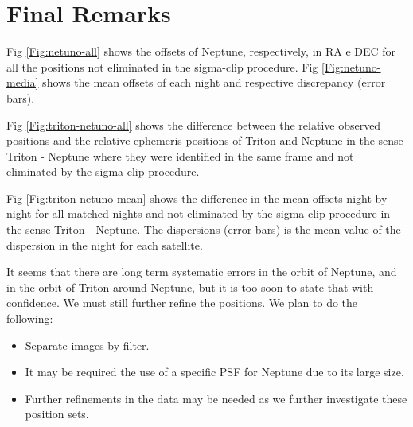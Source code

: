 \documentclass[12pt,a4paper]{report}
\begin{document}

\section*{Final Remarks}

Fig \ref{Fig:netuno-all} shows the offsets of Neptune, respectively, in RA e DEC for all the positions not eliminated in the sigma-clip procedure. Fig \ref{Fig:netuno-media} shows the mean offsets of each night and respective discrepancy (error bars).

Fig \ref{Fig:triton-netuno-all} shows the difference between the relative observed positions and the relative ephemeris positions of Triton and Neptune in the sense Triton - Neptune where they were identified in the same frame and not eliminated by the sigma-clip procedure.

Fig \ref{Fig:triton-netuno-mean} shows the difference in the mean offsets night by night for all matched nights and not eliminated by the sigma-clip procedure in the sense Triton - Neptune. The dispersions (error bars) is the mean value of the dispersion in the night for each satellite.



It seems that there are long term systematic errors in the orbit of Neptune, and in the orbit of Triton around Neptune, but it is too soon to state that with confidence. We must still further refine the positions. We plan to do the following:

\begin{itemize}
\item Separate images by filter.
\item It may be required the use of a specific PSF for Neptune due to its large size.
\item Further refinements in the data may be needed as we further investigate these position sets.
\end{itemize}
\end{document}
